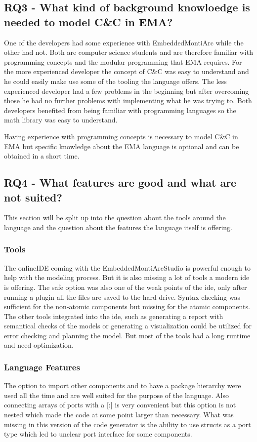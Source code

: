\subsection{RQ3 - What kind of background knowloedge is needed to model C\&C in EMA?}
One of the developers had some experience with EmbeddedMontiArc while the other had not. Both are computer science students and are therefore familiar with programming concepts and the modular programming that EMA requires. For the more experienced developer the concept of C\&C was easy to understand and he could easily make use some of the tooling the language offers. The less experienced developer had a few problems in the beginning but after overcoming those he had no further problems with implementing what he was trying to. Both developers benefited from being familiar with programming languages so the math library was easy to understand. 

Having experience with programming concepts is necessary to model C\&C in EMA but specific knowledge about the EMA language is optional and can be obtained in a short time.

\subsection{RQ4 - What features are good and what are not suited?}
This section will be split up into the question about the tools around the language and the question about the features the language itself is offering.

\subsubsection{Tools}
The onlineIDE coming with the EmbeddedMontiArcStudio is powerful enough to help with the modeling process. But it is also missing a lot of tools a modern ide is offering. The safe option was also one of the weak points of the ide, only after running a plugin all the files are saved to the hard drive. Syntax checking was sufficient for the non-atomic components but missing for the atomic components. The other tools integrated into the ide, such as generating a report with semantical checks of the models or generating a visualization could be utilized for error checking and planning the model. But most of the tools had a long runtime and need optimization.

\subsubsection{Language Features}
The option to import other components and to have a package hierarchy were used all the time and are well suited for the purpose of the language. Also connecting arrays of ports with a [:] is very convenient but this option is not nested which made the code at some point larger than necessary. What was missing in this version of the code generator is the ability to use structs as a port type which led to unclear port interface for some components.

